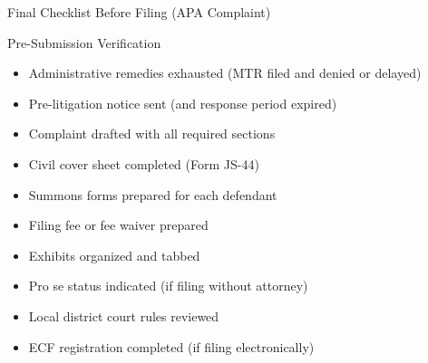 \documentclass[11pt]{beamer}
\begin{document}
	\begin{frame}{Final Checklist Before Filing (APA Complaint)}
		\scriptsize
		\begin{block}{Pre-Submission Verification}
			\begin{itemize}
				\item [$\square$] Administrative remedies exhausted (MTR filed and denied or delayed)
				\item [$\square$] Pre-litigation notice sent (and response period expired)
				\item [$\square$] Complaint drafted with all required sections
				\item [$\square$] Civil cover sheet completed (Form JS-44)
				\item [$\square$] Summons forms prepared for each defendant
				\item [$\square$] Filing fee or fee waiver prepared
				\item [$\square$] Exhibits organized and tabbed
				\item [$\square$] Pro se status indicated (if filing without attorney)
				\item [$\square$] Local district court rules reviewed
				\item [$\square$] ECF registration completed (if filing electronically)
			\end{itemize}
		\end{block}
	\end{frame}
	
	
\end{document}

